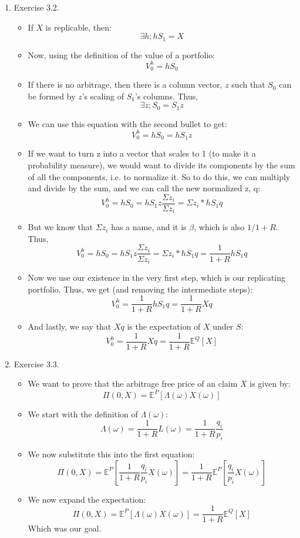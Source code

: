 \documentclass[12pt]{article}
\newcommand{\Ex}{\mathbf{E}}
\begin{document}
\begin{enumerate}
\begin{itemize}
\begin{comment} 
  \textit{Solution}: The arbitrage free date 0 price of $Put4$ is $\frac{1}{2} \Ex^{(\frac{1}{4}, \frac{1}{4}, \frac{1}{2})} Put4_1 = \frac{1}{2} (\frac{1}{2} \cdot 2) = \frac{1}{2}$.
\end{comment}
\end{itemize}
  \item Exercise 3.2.
  \begin{itemize}
      \item If $X$ is replicable, then:
      $$\exists h; hS_1 = X$$
      \item Now, using the definition of the value of a portfolio:
      $$V_0^h = hS_0$$
      \item If there is no arbitrage, then there is a column vector, $z$ such that $S_0$ can be formed by $z$'s scaling of $S_1$'s columns. Thus,
      $$\exists z; S_0 = S_1z$$
      \item We can use this equation with the second bullet to get:
      $$V_0^h = hS_0 = hS_1z$$
      \item If we want to turn z into a vector that scales to 1 (to make it a probability measure), we would want to divide its components by the sum of all the components, i.e. to normalize it. So to do this, we can multiply and divide by the sum, and we can call the new normalized z, q:
      $$V_0^h = hS_0 = hS_1z \frac{\Sigma z_i}{\Sigma z_i} = \Sigma z_i * hS_1q $$
      \item But we know that $\Sigma z_i$ has a name, and it is $\beta$, which is also $1/1+R$. Thus,
      $$V_0^h = hS_0 = hS_1z \frac{\Sigma z_i}{\Sigma z_i} = \Sigma z_i * hS_1q =  \frac{1}{1+R}hS_1q$$
      \item Now we use our existence in the very first step, which is our replicating portfolio.  Thus, we get (and removing the intermediate steps):
      $$V_0^h =  \frac{1}{1+R}hS_1q = \frac{1}{1+R}Xq $$
      \item And lastly, we say that $Xq$ is the expectation of $X$ under $S$:
      $$V_0^h = \frac{1}{1+R}Xq = \frac{1}{1+R}\mathbb{E}^Q[X]$$
  \end{itemize}
  \item Exercise 3.3.
  \begin{itemize}
      \item We want to prove that the arbitrage free price of an claim $X$ is given by:
      $$\Pi (0,X) = \mathbb{E}^P[\Lambda (\omega) X(\omega)]$$
      \item We start with the definition of $\Lambda (\omega)$:
      $$\Lambda (\omega) = \frac{1}{1+R} L(\omega) = \frac{1}{1+R} \frac{q_i}{p_i}$$
      \item We now substitute this into the first equation:
            $$\Pi (0,X) = \mathbb{E}^P[\frac{1}{1+R} \frac{q_i}{p_i} X(\omega)] = \frac{1}{1+R}\mathbb{E}^P[ \frac{q_i}{p_i} X(\omega)]$$
        \item We now expand the expectation:
        $$\Pi (0,X)  = \mathbb{E}^P[\Lambda (\omega) X(\omega)] = \frac{1}{1+R}\mathbb{E}^Q [X] $$
        Which was our goal.
  \end{itemize}

\end{enumerate}
\end{document}
